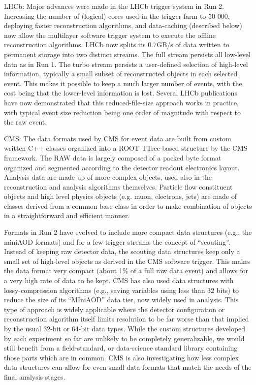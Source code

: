 LHCb: Major advances were made in the LHCb trigger system in Run 2. Increasing the number of (logical) cores used in the trigger farm to 50 000, deploying faster reconstruction algorithms, and data-caching (described below) now allow the multilayer software trigger system to execute the offline reconstruction algorithms. LHCb now splits its 0.7GB/s of data written to permanent storage into two distinct streams. The full stream persists all low-level data as in Run 1. The turbo stream persists a user-defined selection of high-level information, typically a small subset of reconstructed objects in each selected event. This makes it possible to keep a much larger number of events, with the cost being that the lower-level information is lost. Several LHCb publications have now demonstrated that this reduced-file-size approach works in practice, with typical event size reduction being one order of magnitude with respect to the raw event. 

CMS: The data formats used by CMS for event data are built from custom written C++ classes organized into a ROOT TTree-based structure by the CMS framework. The RAW data is largely composed of a packed byte format organized and segmented according to the detector readout electronics layout. Analysis data are made up of more complex objects, used also in the reconstruction and analysis algorithms themselves. Particle flow constituent objects and high level physics objects (e.g. muon, electrons, jets) are made of classes derived from a common base class in order to make combination of objects in a straightforward and efficient manner.

Formats in Run 2 have evolved to include more compact data structures (e.g., the miniAOD formats) and for a few trigger streams the concept of “scouting”. Instead of keeping raw detector data, the scouting data structures keep only a small set of high-level objects as derived in the CMS software trigger. This makes the data format very compact (about 1\% of a full raw data event) and allows for a very high rate of data to be kept. CMS has also used data structures with lossy-compression algorithms (e.g., saving variables using less than 32 bits) to reduce the size of its “MIniAOD” data tier, now widely used in analysis. This type of approach is widely applicable where the detector configuration or reconstruction algorithm itself limits resolution to be far worse than that implied by the usual 32-bit or 64-bit data types. While the custom structures developed by each experiment so far are unlikely to be completely generalizable, we would still benefit from a field-standard, or data-science standard library containing those parts which are in common.  CMS is also investigating how less complex data structures can allow for even small data formats that match the needs of the final analysis stages.

